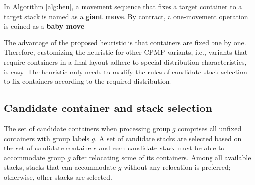 \documentclass[review,3p,times,authoryear,12pt]{elsarticle}
\begin{document}
In Algorithm \ref{alg:heu}, a movement sequence that fixes a target container to a target stack is named as a \textbf{giant move}. By contract, a one-movement operation is coined as a \textbf{baby move}.

The advantage of the proposed heuristic is that containers are fixed one by one. Therefore, customizing the heuristic for other CPMP variants, i.e., variants that require containers in a final layout adhere to special distribution characteristics, is easy. The heuristic only needs to modify the rules of candidate stack selection to fix containers according to the required distribution.



\subsection{Candidate container and stack selection}
\label{sec:can}
The set of candidate containers when processing group $g$ comprises all unfixed containers with group labels $g$. A set of candidate stacks are selected based on the set of candidate containers and each candidate stack must be able to accommodate group $g$ after relocating some of its containers.
Among all available stacks, stacks that can accommodate $g$ without any relocation is preferred; otherwise, other stacks are selected.
\end{document}
